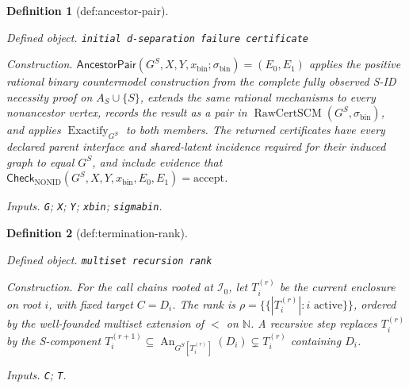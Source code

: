 \documentclass{article}
\newtheorem{definition}{Definition}
\begin{document}
\begin{definition}[def:ancestor-pair]\label{def:ancestor-pair}
\par\smallskip\noindent\emph{Defined object.} \texttt{initial d-\allowbreak{}separation failure certificate}
\par\smallskip\noindent\emph{Construction.} \(\mathsf{AncestorPair}(G^S,X,Y,x_{\mathrm{bin}};\sigma_{\mathrm{bin}})=(E_0,E_1)\) applies the positive rational binary countermodel construction from the complete fully observed S-ID necessity proof on \(A_S\cup\{S\}\), extends the same rational mechanisms to every nonancestor vertex, records the result as a pair in \(\operatorname{RawCertSCM}(G^S,\sigma_{\mathrm{bin}})\), and applies \(\operatorname{Exactify}_{G^S}\) to both members. The returned certificates have every declared parent interface and shared-latent incidence required for their induced graph to equal \(G^S\), and include evidence that \(\mathsf{Check}_{\mathrm{NONID}}(G^S,X,Y,x_{\mathrm{bin}},E_0,E_1)=\mathrm{accept}\).
\par\smallskip\noindent\emph{Inputs.} \texttt{G}; \texttt{X}; \texttt{Y}; \texttt{xbin}; \texttt{sigmabin}.
\end{definition}

\begin{definition}[def:termination-rank]\label{def:termination-rank}
\par\smallskip\noindent\emph{Defined object.} \texttt{multiset recursion rank}
\par\smallskip\noindent\emph{Construction.} For the call chains rooted at \(\mathcal I_0\), let \(T_i^{(r)}\) be the current enclosure on root \(i\), with fixed target \(C=D_i\). The rank is \(\rho=\{\!\{|T_i^{(r)}|:i\text{ active}\}\!\}\), ordered by the well-founded multiset extension of \(<\) on \(\mathbb N\). A recursive step replaces \(T_i^{(r)}\) by the S-component \(T_i^{(r+1)}\subseteq\operatorname{An}_{G^S[T_i^{(r)}]}(D_i)\subsetneq T_i^{(r)}\) containing \(D_i\).
\par\smallskip\noindent\emph{Inputs.} \texttt{C}; \texttt{T}.
\end{definition}
\end{document}
